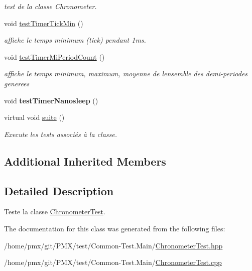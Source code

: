 \begin{DoxyCompactItemize}
\begin{DoxyCompactList}\small\item\em test de la classe Chronometer. \end{DoxyCompactList}\item 
\mbox{\label{classtest_1_1ChronometerTest_a93932625023cde9ef1ae40f9458aa9fb}} 
void \hyperlink{classtest_1_1ChronometerTest_a93932625023cde9ef1ae40f9458aa9fb}{test\+Timer\+Tick\+Min} ()
\begin{DoxyCompactList}\small\item\em affiche le temps minimum (tick) pendant 1ms. \end{DoxyCompactList}\item 
\mbox{\label{classtest_1_1ChronometerTest_a20811a4ca21df028b3f67b9051f3b599}} 
void \hyperlink{classtest_1_1ChronometerTest_a20811a4ca21df028b3f67b9051f3b599}{test\+Timer\+Mi\+Period\+Count} ()
\begin{DoxyCompactList}\small\item\em affiche le temps minimum, maximum, moyenne de l\textquotesingle{}ensemble des demi-\/periodes generees \end{DoxyCompactList}\item 
\mbox{\label{classtest_1_1ChronometerTest_a6c5610f71b787e188ee7f3aafb32bdba}} 
void {\bfseries test\+Timer\+Nanosleep} ()
\item 
\mbox{\label{classtest_1_1ChronometerTest_a1c7e36190a3c3f415a5547d408883d76}} 
virtual void \hyperlink{classtest_1_1ChronometerTest_a1c7e36190a3c3f415a5547d408883d76}{suite} ()
\begin{DoxyCompactList}\small\item\em Execute les tests associés à la classe. \end{DoxyCompactList}\end{DoxyCompactItemize}
\subsection*{Additional Inherited Members}


\subsection{Detailed Description}
Teste la classe \hyperlink{classtest_1_1ChronometerTest}{Chronometer\+Test}. 

The documentation for this class was generated from the following files\+:\begin{DoxyCompactItemize}
\item 
/home/pmx/git/\+P\+M\+X/test/\+Common-\/\+Test.\+Main/\hyperlink{ChronometerTest_8hpp}{Chronometer\+Test.\+hpp}\item 
/home/pmx/git/\+P\+M\+X/test/\+Common-\/\+Test.\+Main/\hyperlink{ChronometerTest_8cpp}{Chronometer\+Test.\+cpp}\end{DoxyCompactItemize}
